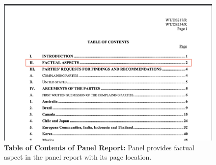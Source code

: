 \begin{figure}[h]
    \centering
    \includegraphics[scale=0.28]{Data/pngs/panel_report_toc.png}
    \caption{
        {\bf Table of Contents of Panel Report: }Panel provides 
        factual aspect in the panel report with its page location.
        }
    \label{fig:panel-report-toc}
\end{figure}
